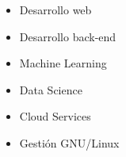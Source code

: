 
\vspace{-0.5cm}
\begin{multicols}{3}
\begin{itemize}
    \renewcommand\labelitemi{\checkmark}
    \setlength\itemsep{0pt}
    \item Desarrollo web
    \item Desarrollo back-end
    \item Machine Learning
    \item Data Science
    \item Cloud Services
    \item Gestión GNU/Linux
\end{itemize}
\end{multicols}
    
